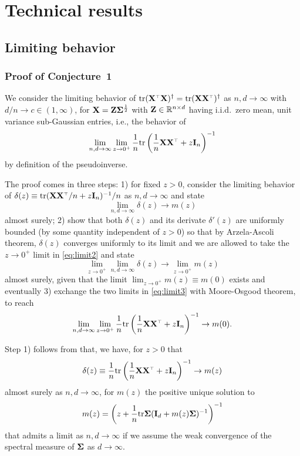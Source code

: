\documentclass[11pt]{article}
\begin{document}
\section{Technical results}

\subsection{Limiting behavior}

\subsubsection{Proof of Conjecture~1}

We consider the limiting behavior of $\tr (\X^\top \X)^\dagger = \tr (\X \X^\top)^\dagger$ as $n,d \to \infty$ with $d/n \to c \in (1,\infty)$, for $\mathbf X = \mathbf Z \mathbf{\Sigma}^{\frac12}$ with $\mathbf Z \in \mathbb R^{n \times d}$ having i.i.d.~zero mean, unit variance sub-Gaussian entries, i.e., the behavior of
\begin{equation}\label{eq:limit1}
  \lim_{n,d \to \infty} \lim_{z \to 0^+} \frac1n \tr \left( \frac1n \X \X^\top + z \I_n \right)^{-1}
\end{equation}
by definition of the pseudoinverse.

The proof comes in three steps: 1) for fixed $z > 0$, consider the limiting behavior of $ \delta(z) \equiv \tr (\X \X^\top/n + z \I_n)^{-1}/n$ as $n,d \to \infty$ and state
\begin{equation}\label{eq:limit2}
  \lim_{n,d \to \infty} \delta(z)  \to m(z)
\end{equation}
almost surely; 2) show that both $\delta(z)$ and its derivate $\delta'(z)$ are uniformly bounded (by some quantity independent of $z>0$) so that by Arzela-Ascoli theorem, $\delta(z)$ converges uniformly to its limit and we are allowed to take the $z \to 0^+$ limit in \eqref{eq:limit2} and state
\begin{equation}\label{eq:limit3}
  \lim_{z \to 0^+} \lim_{n,d \to \infty} \delta(z)  \to \lim_{z \to 0^+} m(z)
\end{equation}
almost surely, given that the limit $\lim_{z \to 0^+} m(z) \equiv m(0)$ exists and eventually 3) exchange the two limits in \eqref{eq:limit3} with Moore-Osgood theorem, to reach
\[
  \lim_{n,d \to \infty} \lim_{z \to 0^+} \frac1n \tr \left(\frac1n \X \X^\top + z \I_n \right)^{-1} \to m(0).
\]

Step 1) follows from \cite{silverstein1995empirical} that, we have, for $z > 0$ that
\[
  \delta(z) \equiv \frac1n \tr \left( \frac1n \X \X^\top  + z \I_n \right)^{-1}  \to m(z)
\]
almost surely as $n,d \to \infty$, for $m(z)$ the positive unique solution to 
\begin{equation}\label{eq:def-m}
  m(z) = \left( z + \frac1n \mathrm{tr} \mathbf{\Sigma} (\mathbf I_d + m(z) \mathbf{\Sigma})^{-1} \right)^{-1}
\end{equation}
that admits a limit as $n,d \to \infty$ if we assume the weak convergence of the spectral measure of $\mathbf{\Sigma}$ as $d \to \infty$.
\end{document}
